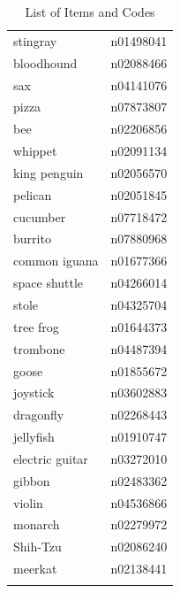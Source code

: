\documentclass{article}
\begin{document}
\begin{longtable}{@{}ll@{}}
            stingray & n01498041 \\
            bloodhound & n02088466 \\
            sax & n04141076 \\
            pizza & n07873807 \\
            bee & n02206856 \\
            whippet & n02091134 \\
            king penguin & n02056570 \\
            pelican & n02051845 \\
            cucumber & n07718472 \\
            burrito & n07880968 \\
            common iguana & n01677366 \\
            space shuttle & n04266014 \\
            stole & n04325704 \\
            tree frog & n01644373 \\
            trombone & n04487394 \\
            goose & n01855672 \\
            joystick & n03602883 \\
            dragonfly & n02268443 \\
            jellyfish & n01910747 \\
            electric guitar & n03272010 \\
            gibbon & n02483362 \\
            violin & n04536866 \\
            monarch & n02279972 \\
            Shih-Tzu & n02086240 \\
            meerkat & n02138441 \\
            \caption{List of Items and Codes} %
            \label{tab:itemcodes} %
            \end{longtable}        
\end{document}
